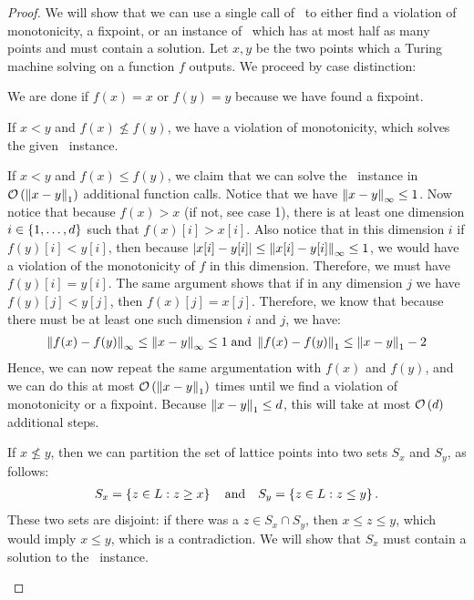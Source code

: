 \begin{proof}
	We will show that we can use a single call of \Tarskistar\ to either find a violation of monotonicity, a fixpoint, or an instance of \Tarski\, which has at most half as many points and must contain a solution. Let $x, y$ be the two points which a Turing machine solving \Tarskistar on a function $f$ outputs. We proceed by case distinction:
	\begin{case}{1}
		We are done if $f(x) = x$ or $f(y) = y$ because we have found a fixpoint.
	\end{case}
	\begin{case}{2.1}
		If $x < y$ and $f(x) \not\leq f(y)$, we have a violation of monotonicity, which solves the given \Tarski\ instance.
	\end{case}
	\begin{case}{2.2}
		If $x < y$ and $f(x) \leq f(y)$, we claim that we can solve the \Tarski\ instance in $\mathcal{O}\left(\left\lVert x - y\right\rVert_{1}\right)$ additional function calls. Notice that we have $\left\lVert x-y\right\rVert_{\infty} \leq 1$. Now notice that because $f(x) > x$ (if not, see case 1), there is at least one dimension $i \in \left\{1, \dots, d\right\}$ such that $f(x)[i] > x[i]$. Also notice that in this dimension $i$ if $f(y)[i] < y[i]$, then because $\left\lvert x[i] - y[i]\right\rvert \leq \left\lVert x[i] - y[i]\right\rVert_{\infty} \leq 1$, we would have a violation of the monotonicity of $f$ in this dimension. Therefore, we must have $f(y)[i] = y[i]$. The same argument shows that if in any dimension $j$ we have $f(y)[j] < y[j]$, then $f(x)[j] = x[j]$. Therefore, we know that because there must be at least one such dimension $i$ and $j$, we have:
		\begin{align*}
			\left\lVert f(x) - f(y)\right\rVert_{\infty} \leq \left\lVert x - y\right\rVert_{\infty} \leq 1 \; \text{and} \; \left\lVert f(x) - f(y)\right\rVert_{1} \leq \left\lVert x - y\right\rVert_{1} - 2
		\end{align*}
		Hence, we can now repeat the same argumentation with $f(x)$ and $f(y)$, and we can do this at most $\mathcal{O}\left(\left\lVert x - y\right\rVert_{1}\right)$ times until we find a violation of monotonicity or a fixpoint. Because $\left\lVert x - y\right\rVert_{1} \leq d$, this will take at most $\mathcal{O}\left(d\right)$ additional steps.
	\end{case}
	\begin{case}{3}
		If $x \not\leq y$, then we can partition the set of lattice points into two sets $S_x$ and $S_y$, as follows:
		\begin{align*}
			S_x = \left\{z \in L : z \geq x\right\} \quad \text{and} \quad S_y = \left\{z \in L : z \leq y\right\}.
		\end{align*}
		These two sets are disjoint: if there was a $z \in S_x \cap S_y$, then $x \leq z \leq y$, which would imply $x \leq y$, which is a contradiction. We will show that $S_x$ must contain a solution to the \Tarski\ instance.

\end{case}
\end{proof}
